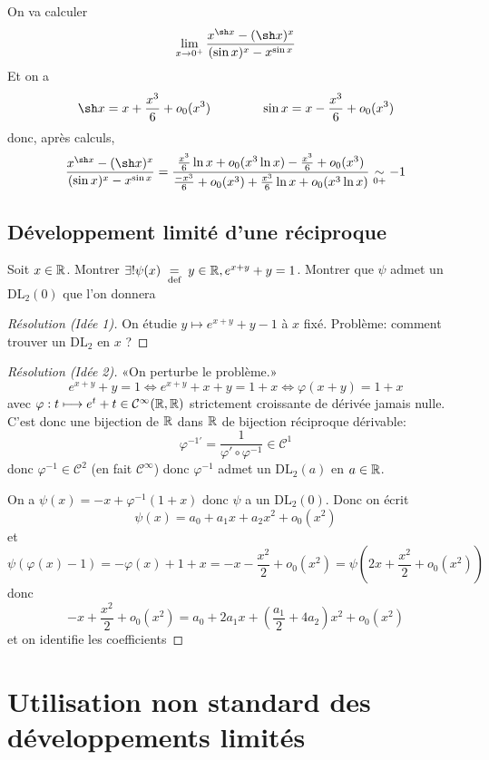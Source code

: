 On va calculer \[
    \lim_{x\to 0^+}\frac{x^{\sh x}-(\sh x)^x}{(\sin x)^x-x^{\sin x}}
\]
Et on a \[
    \sh x=x+\frac{x^3}6+o_0(x^3)\qquad\qquad \sin x=x-\frac{x^3}6+o_0(x^3)
\]
donc, après calculs, \[
    \frac{x^{\sh x}-(\sh x)^x}{(\sin x)^x-x^{\sin x}} = \frac{\frac{x^3}6\ln x+o_0(x^3\ln x)-\frac{x^3}6+o_0(x^3)}{\frac{-x^3}6+o_0(x^3)+\frac{x^3}6\ln x+o_0(x^3\ln x)}\underset{0+}\sim -1
\]

\subsection{Développement limité d'une réciproque}

\begin{exo}
    Soit $x\in\mathbb R$. Montrer $\exists!\psi(x)\;\underset{\text{def}}=\; y\in\mathbb R, e^{x+y}+y=1$. Montrer que $\psi$ admet un $\mathrm{DL}_2(0)$ que l'on donnera
\end{exo}

\begin{proof}[Résolution (Idée 1)]
    On étudie $y\longmapsto e^{x+y}+y-1$ à $x$ fixé. Problème: comment trouver un $\mathrm{DL}_2$ en $x$ ?
\end{proof}

\begin{proof}[Résolution (Idée 2)]
    «On perturbe le problème.» \[
        e^{x+y}+y=1\iff e^{x+y}+x+y=1+x \iff \varphi(x+y)=1+x
    \]
    avec $\varphi: t\longmapsto e^t+t\in\mathcal C^{\infty}(\mathbb R, \mathbb R)$ strictement croissante de dérivée jamais nulle. C'est donc une bijection de $\mathbb R$ dans $\mathbb R$ de bijection réciproque dérivable: \[
        \varphi^{-1'}=\frac1{\varphi'\circ \varphi^{-1}}\in\mathcal C^1
    \]
    donc $\varphi^{-1}\in\mathcal C^2$ (en fait $\mathcal C^{\infty}$) donc $\varphi^{-1}$ admet un $\mathrm{DL}_2(a)$ en $a\in\mathbb R$.

    On a $\psi(x)=-x+\varphi^{-1}(1+x)$ donc $\psi$ a un $\mathrm{DL}_2(0)$. Donc on écrit \[
        \psi(x)=a_0+a_1x+a_2x^2+o_0(x^2)
    \]
    et \[\psi(\varphi(x)-1)=-\varphi(x)+1+x=-x-\frac{x^2}2+o_0(x^2)=\psi \left(2x+\frac{x^2}2+o_0(x^2)\right)\]
    donc \[
        -x+\frac{x^2}2+o_0(x^2)=a_0+2a_1x+\left(\frac{a_1}2+4a_2\right)x^2+o_0(x^2)
    \]
    et on identifie les coefficients
\end{proof}

\section{Utilisation non standard des développements limités}

